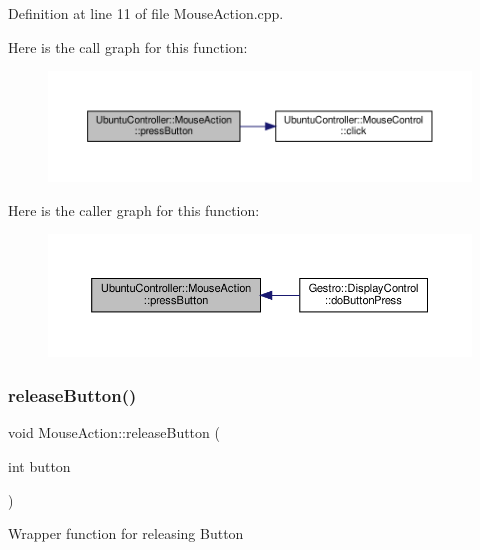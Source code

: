 Definition at line 11 of file Mouse\+Action.\+cpp.

Here is the call graph for this function\+:
\nopagebreak
\begin{figure}[H]
\begin{center}
\leavevmode
\includegraphics[width=350pt]{class_ubuntu_controller_1_1_mouse_action_aa017b86a7e358e7a74a8ec50a5a191cf_cgraph}
\end{center}
\end{figure}
Here is the caller graph for this function\+:
\nopagebreak
\begin{figure}[H]
\begin{center}
\leavevmode
\includegraphics[width=350pt]{class_ubuntu_controller_1_1_mouse_action_aa017b86a7e358e7a74a8ec50a5a191cf_icgraph}
\end{center}
\end{figure}
\mbox{\label{class_ubuntu_controller_1_1_mouse_action_ab1ac193e88baf8614c55ca2fa7a3b430}} 
\subsubsection{\texorpdfstring{release\+Button()}{releaseButton()}}
{\footnotesize\ttfamily void Mouse\+Action\+::release\+Button (\begin{DoxyParamCaption}\item[{int}]{button }\end{DoxyParamCaption})}

Wrapper function for releasing Button


